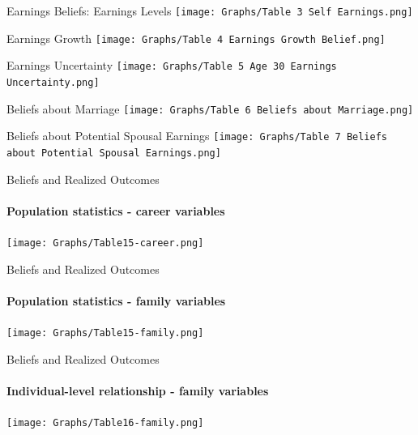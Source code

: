 \documentclass[12pt]{beamer}
\begin{document}
\begin{frame}{Earnings Beliefs: Earnings Levels}
    \texttt{[image: Graphs/Table 3 Self Earnings.png]}
\end{frame}

\begin{frame}{Earnings Growth}
    \texttt{[image: Graphs/Table 4 Earnings Growth Belief.png]}
\end{frame}

\begin{frame}{Earnings Uncertainty}
    \texttt{[image: Graphs/Table 5 Age 30 Earnings Uncertainty.png]}
\end{frame}

\begin{frame}{Beliefs about Marriage}
    \texttt{[image: Graphs/Table 6 Beliefs about Marriage.png]}
\end{frame}

\begin{frame}{Beliefs about Potential Spousal Earnings}
    \texttt{[image: Graphs/Table 7 Beliefs about Potential Spousal Earnings.png]}
\end{frame}

\begin{frame}{Beliefs and Realized Outcomes}
    \framesubtitle{Population statistics - career variables}
    \begin{center}
        \texttt{[image: Graphs/Table15-career.png]}
    \end{center}
\end{frame}

\begin{frame}{Beliefs and Realized Outcomes}
    \framesubtitle{Population statistics - family variables}
    \begin{center}
        \texttt{[image: Graphs/Table15-family.png]}
    \end{center}
\end{frame}

\begin{frame}{Beliefs and Realized Outcomes}
    \framesubtitle{Individual-level relationship - family variables}
    \begin{center}
        \texttt{[image: Graphs/Table16-family.png]}
    \end{center}
\end{frame}
\end{document}
